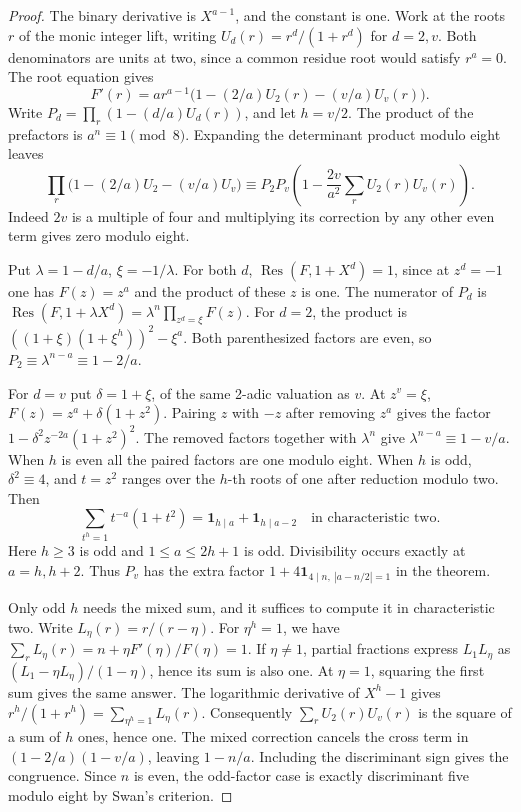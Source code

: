 \documentclass[11pt]{article}
\begin{document}
\begin{proof}
The binary derivative is \(X^{a-1}\), and the constant is one. Work
at the roots \(r\) of the monic integer lift, writing
\(U_d(r)=r^d/(1+r^d)\) for \(d=2,v\). Both denominators are units at
two, since a common residue root would satisfy \(r^a=0\).
The root equation gives
\[
 F'(r)= ar^{a-1}\bigl(1-(2/a)U_2(r)-(v/a)U_v(r)\bigr).
\]
Write \(P_d=\prod_r(1-(d/a)U_d(r))\), and let \(h=v/2\).
The product of the prefactors is \(a^n\equiv1\pmod8\).
Expanding the determinant product modulo eight leaves
\[
 \prod_r\bigl(1-(2/a)U_2-(v/a)U_v\bigr)
 \equiv P_2P_v\left(1-\frac{2v}{a^2}\sum_rU_2(r)U_v(r)\right).
\]
Indeed \(2v\) is a multiple of four and multiplying its correction by
any other even term gives zero modulo eight.

Put \(\lambda=1-d/a\), \(\xi=-1/\lambda\). For both \(d\),
\(\operatorname{Res}(F,1+X^d)=1\), since at \(z^d=-1\) one has
\(F(z)=z^a\) and the product of these \(z\) is one. The numerator of
\(P_d\) is \(\operatorname{Res}(F,1+\lambda X^d)=\lambda^n
\prod_{z^d=\xi}F(z)\). For \(d=2\), the product is
\( ((1+\xi)(1+\xi^h))^2-\xi^a\). Both parenthesized factors
are even, so \(P_2\equiv\lambda^{n-a}\equiv1-2/a\).

For \(d=v\) put \(\delta=1+\xi\), of the same 2-adic valuation as
\(v\). At \(z^v=\xi\), \(F(z)=z^a+\delta(1+z^2)\).
Pairing \(z\) with \(-z\) after removing \(z^a\) gives the factor
\(1-\delta^2 z^{-2a}(1+z^2)^2\). The removed factors together with
\(\lambda^n\) give \(\lambda^{n-a}\equiv1-v/a\).
When \(h\) is even all the paired factors are one modulo eight.
When \(h\) is odd, \(\delta^2\equiv4\), and \(t=z^2\) ranges over
the \(h\)-th roots of one after reduction modulo two. Then
\[
 \sum_{t^h=1}t^{-a}(1+t^2)=\mathbf1_{h\mid a}+\mathbf1_{h\mid a-2}
       \quad\text{in characteristic two}.
\]
Here \(h\ge3\) is odd and \(1\le a\le2h+1\) is odd. Divisibility
occurs exactly at \(a=h,h+2\). Thus \(P_v\) has the extra factor
\(1+4\mathbf1_{4\mid n,\ |a-n/2|=1}\) in the theorem.

Only odd \(h\) needs the mixed sum, and it suffices to compute it in
characteristic two. Write \(L_\eta(r)=r/(r-\eta)\). For \(\eta^h=1\),
we have \(\sum_r L_\eta(r)=n+\eta F'(\eta)/F(\eta)=1\). If
\(\eta\ne1\), partial fractions express \(L_1L_\eta\) as
\((L_1-\eta L_\eta)/(1-\eta)\), hence its sum is also one. At
\(\eta=1\), squaring the first sum gives the same answer. The logarithmic
derivative of \(X^h-1\) gives \(r^h/(1+r^h)=\sum_{\eta^h=1}L_\eta(r)\).
Consequently \(\sum_r U_2(r)U_v(r)\) is the square of a sum of \(h\)
ones, hence one. The mixed correction cancels the cross term in
\((1-2/a)(1-v/a)\), leaving \(1-n/a\). Including the discriminant
sign gives the congruence. Since \(n\) is even, the odd-factor case
is exactly discriminant five modulo eight by Swan's criterion.
\end{proof}
\end{document}
